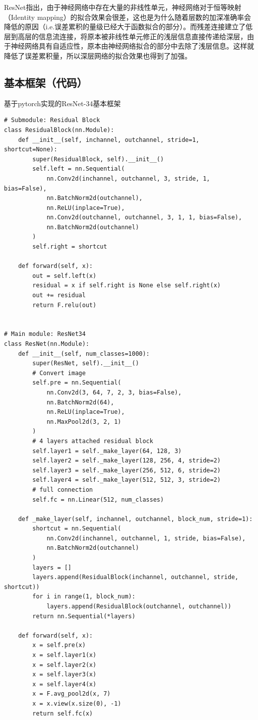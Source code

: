 ResNet指出，由于神经网络中存在大量的非线性单元，神经网络对于恒等映射（Identity
mapping）的拟合效果会很差，这也是为什么随着层数的加深准确率会降低的原因（i.e.误差累积的量级已经大于函数拟合的部分）。而残差连接建立了低层到高层的信息流连接，将原本被非线性单元修正的浅层信息直接传递给深层，由于神经网络具有自适应性，原本由神经网络拟合的部分中去除了浅层信息。这样就降低了误差累积量，所以深层网络的拟合效果也得到了加强。

\subsection{基本框架（代码）}\label{ux57faux672cux6846ux67b6ux4ee3ux7801}

基于pytorch实现的ResNet-34基本框架

\begin{lstlisting}
# Submodule: Residual Block
class ResidualBlock(nn.Module):
    def __init__(self, inchannel, outchannel, stride=1, shortcut=None):
        super(ResidualBlock, self).__init__()
        self.left = nn.Sequential(
            nn.Conv2d(inchannel, outchannel, 3, stride, 1, bias=False),
            nn.BatchNorm2d(outchannel),
            nn.ReLU(inplace=True),
            nn.Conv2d(outchannel, outchannel, 3, 1, 1, bias=False),
            nn.BatchNorm2d(outchannel)
        )
        self.right = shortcut

    def forward(self, x):
        out = self.left(x)
        residual = x if self.right is None else self.right(x)
        out += residual
        return F.relu(out)


# Main module: ResNet34
class ResNet(nn.Module):
    def __init__(self, num_classes=1000):
        super(ResNet, self).__init__()
        # Convert image
        self.pre = nn.Sequential(
            nn.Conv2d(3, 64, 7, 2, 3, bias=False),
            nn.BatchNorm2d(64),
            nn.ReLU(inplace=True),
            nn.MaxPool2d(3, 2, 1)
        )
        # 4 layers attached residual block
        self.layer1 = self._make_layer(64, 128, 3)
        self.layer2 = self._make_layer(128, 256, 4, stride=2)
        self.layer3 = self._make_layer(256, 512, 6, stride=2)
        self.layer4 = self._make_layer(512, 512, 3, stride=2)
        # full connection
        self.fc = nn.Linear(512, num_classes)

    def _make_layer(self, inchannel, outchannel, block_num, stride=1):
        shortcut = nn.Sequential(
            nn.Conv2d(inchannel, outchannel, 1, stride, bias=False),
            nn.BatchNorm2d(outchannel)
        )
        layers = []
        layers.append(ResidualBlock(inchannel, outchannel, stride, shortcut))
        for i in range(1, block_num):
            layers.append(ResidualBlock(outchannel, outchannel))
        return nn.Sequential(*layers)

    def forward(self, x):
        x = self.pre(x)
        x = self.layer1(x)
        x = self.layer2(x)
        x = self.layer3(x)
        x = self.layer4(x)
        x = F.avg_pool2d(x, 7)
        x = x.view(x.size(0), -1)
        return self.fc(x)
\end{lstlisting}

